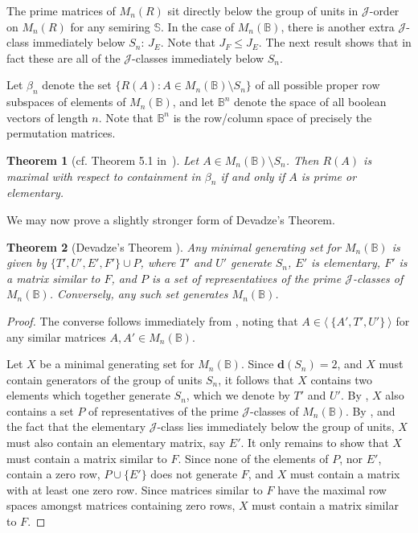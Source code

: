 \documentclass[11pt]{article}
\newtheorem{thm}{Theorem}[section]
\numberwithin{equation}{section}
\newcommand{\set}[2]{\ensuremath{\{#1 : #2 \}}}
\newcommand{\genset}[1]{\ensuremath{\langle\: #1 \:\rangle}}
\newcommand{\B}{\mathbb{B}}
\newcommand{\Bn}{M_n(\B)}
\newcommand{\J}{\mathscr{J}}
\begin{document}
The prime matrices of $M_n(R)$ sit directly below the group of units in
$\J$-order on $M_n(R)$ for any semiring $\mathbb{S}$. In the case of $\Bn$,
there is another extra $\J$-class immediately below $S_n$: $J_E$. Note that $J_F
\leq J_E$. The next result shows that in fact these are all of the $\J$-classes
immediately below $S_n$.

Let $\beta_n$ denote the set $\set{R(A)}{A\in \Bn\setminus S_n}$ of all
possible proper row subspaces of elements of $\Bn$, and let $\B^n$ denote
the space of all boolean vectors of length $n$. Note that $\B^n$ is the
row/column space of precisely the permutation matrices.

\begin{thm}[cf. Theorem 5.1 in~\cite{Caen1981ab}]
  Let $A \in \Bn\setminus S_n$. Then $R(A)$ is maximal with respect to
  containment in $\beta_n$ if and only if $A$ is prime or elementary.  
\end{thm}


We may now prove a slightly stronger form of Devadze's Theorem.
\begin{thm}[Devadze's Theorem \cite{Konieczny2011aa}]
  Any minimal generating set for $\Bn$ is given by $\{T', U', E', F'\} \cup P$,
  where $T'$ and $U'$ generate $S_n$, $E'$ is elementary, $F'$ is a matrix
  similar to $F$, and $P$ is a set of representatives of the prime $\J$-classes
  of $\Bn$. Conversely, any such set generates $\Bn$.
\end{thm}
\begin{proof}
  The converse follows immediately from , noting that $A
  \in \genset{\{A', T', U'\}}$ for any similar matrices $A, A' \in \Bn$.

  Let $X$ be a minimal generating set for $\Bn$. Since $\mathbf{d}(S_n) = 2$,
  and $X$ must contain generators of the group of units $S_n$, it follows that
  $X$ contains two elements which together generate $S_n$, which we denote by
  $T'$ and $U'$. By \cite[Lemma 4.2]{Konieczny2011aa}, $X$ also contains a set
  $P$ of representatives of the prime $\J$-classes of $\Bn$. By \cite[Lemma
  4.5]{Konieczny2011aa}, and the fact that the elementary $\J$-class lies
  immediately below the group of units, $X$ must also contain an elementary
  matrix, say $E'$. It only remains to show that $X$ must contain a matrix
  similar to $F$. Since none of the elements of $P$, nor $E'$, contain a
  zero row, $P \cup \{E'\}$ does not generate $F$, and $X$ must contain a matrix
  with at least one zero row. Since matrices similar to $F$ have the maximal row
  spaces amongst matrices containing zero rows, $X$ must contain a matrix
  similar to $F$.
\end{proof}
\end{document}
